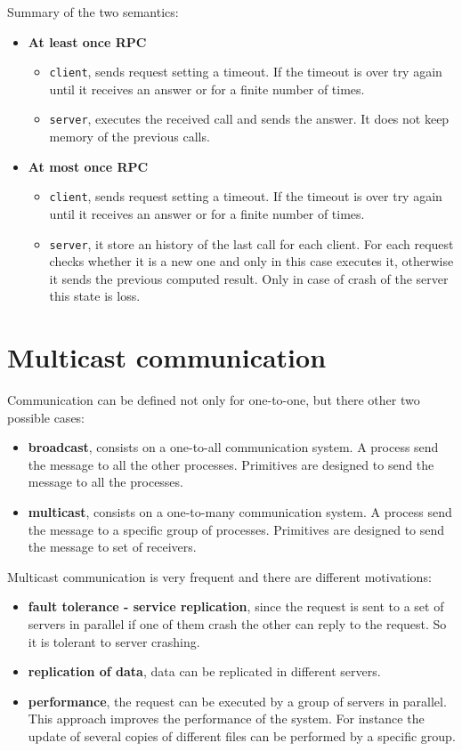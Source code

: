 \documentclass[11pt,a4paper]{article}
\begin{document}
Summary of the two semantics:

\begin{itemize}
	\item \textbf{At least once RPC}
	\begin{itemize}
		\item \verb|client|, sends request setting a timeout. If the timeout is over try again until it receives an answer or for a finite number of times.
		\item \verb|server|, executes the received call and sends the answer. It does not keep memory of the previous calls.
	\end{itemize}
	
	
	\item \textbf{At most once RPC}
	\begin{itemize}
		\item \verb|client|, sends request setting a timeout. If the timeout is over try again until it receives an answer or for a finite number of times.
		\item \verb|server|, it store an history of the last call for each client. For each request checks whether it is a new one and only in this case executes it, otherwise it sends the previous computed result. Only in case of crash of the server this state is loss.
	\end{itemize}
\end{itemize}


\section{Multicast communication}
Communication can be defined not only for one-to-one, but there other two possible cases:
\begin{itemize}
	\item \textbf{broadcast}, consists on a one-to-all communication system. A process send the message to all the other processes. Primitives are designed to send the message to all the processes.
	\item \textbf{multicast}, consists on a one-to-many communication system. A process send the message to a specific group of processes. Primitives are designed to send the message to set of receivers.
\end{itemize}
Multicast communication is very frequent and there are different motivations:
\begin{itemize}
	\item \textbf{fault tolerance - service replication}, since the request is sent to a set of servers in parallel if one of them crash the other can reply to the request. So it is tolerant to server crashing.
	\item \textbf{replication of data}, data can be replicated in different servers.
	\item \textbf{performance}, the request can be executed by a group of servers in parallel. This approach improves the performance of the system. For instance the update of several copies of different files can be performed by a specific group.
\end{itemize}
\end{document}
